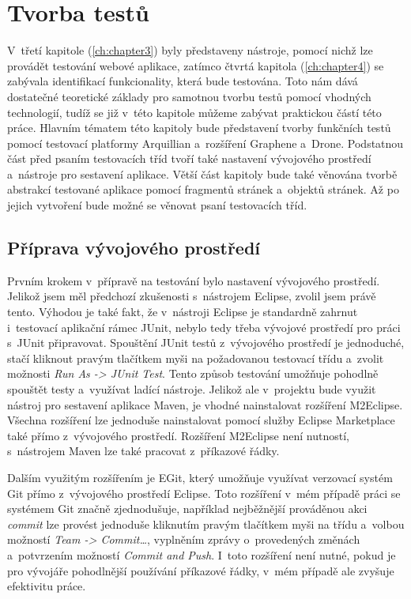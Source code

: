 \documentclass[
    color,   %
	table,   %
    twoside, %
    nolot, nolof,
]{fithesis3}
\begin{document}
\chapter{Tvorba testů}
\label{ch:chapter5}
V~třetí kapitole (\ref{ch:chapter3}) byly představeny nástroje, pomocí nichž lze provádět testování webové aplikace, zatímco čtvrtá kapitola (\ref{ch:chapter4}) se zabývala identifikací funkcionality, která bude testována. Toto nám dává dostatečné teoretické základy pro samotnou tvorbu testů pomocí vhodných technologií, tudíž se již v~této kapitole můžeme zabývat praktickou částí této práce. Hlavním tématem této kapitoly bude představení tvorby funkčních testů pomocí testovací platformy Arquillian a~rozšíření Graphene a~Drone. Podstatnou část před psaním testovacích tříd tvoří také nastavení vývojového prostředí a~nástroje pro sestavení aplikace. Větší část kapitoly bude také věnována tvorbě abstrakcí testované aplikace pomocí fragmentů stránek a~objektů stránek. Až po jejich vytvoření bude možné se věnovat psaní testovacích tříd.

\section{Příprava vývojového prostředí}
Prvním krokem v~přípravě na testování bylo nastavení vývojového prostředí. Jelikož jsem měl předchozí zkušenosti s~nástrojem Eclipse, zvolil jsem právě tento. Výhodou je také fakt, že v~nástroji Eclipse je standardně zahrnut i~testovací aplikační rámec JUnit, nebylo tedy třeba vývojové prostředí  pro práci s~JUnit připravovat. Spouštění JUnit testů z~vývojového prostředí je jednoduché, stačí kliknout pravým tlačítkem myši na požadovanou testovací třídu a~zvolit možnosti \emph{Run As -> JUnit Test}. Tento způsob testování umožňuje pohodlně spouštět testy a~využívat ladící nástroje. Jelikož ale v~projektu bude využit nástroj pro sestavení aplikace Maven, je vhodné nainstalovat rozšíření M2Eclipse. Všechna rozšíření lze jednoduše nainstalovat pomocí služby Eclipse Marketplace také přímo z~vývojového prostředí. Rozšíření M2Eclipse není nutností, s~nástrojem Maven lze také pracovat z~příkazové řádky.

Dalším využitým rozšířením je EGit, který umožňuje využívat verzovací systém Git přímo z~vývojového prostředí Eclipse. Toto rozšíření v~mém případě práci se systémem Git značně zjednodušuje, například nejběžnější prováděnou akci \emph{commit} lze provést jednoduše kliknutím pravým tlačítkem myši na třídu a~volbou možností \emph{Team -> Commit\ldots}, vyplněním zprávy o~provedených změnách a~potvrzením možností \emph{Commit and Push}. I~toto rozšíření není nutné, pokud je pro vývojáře pohodlnější používání příkazové řádky, v~mém případě ale zvyšuje efektivitu práce.
\end{document}
